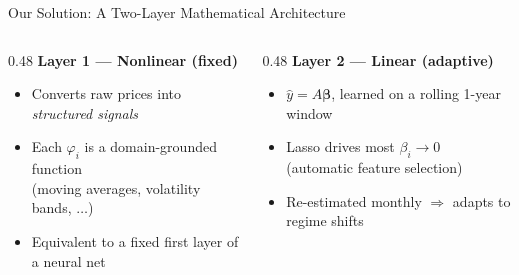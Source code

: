 \documentclass[aspectratio=169]{beamer}
\begin{document}
\begin{frame}{Our Solution: A Two-Layer Mathematical Architecture}
  \vspace{0.5em}
  \begin{columns}[T]
    \begin{column}{0.48\textwidth}
      \textbf{Layer 1 --- Nonlinear (fixed)}
      \begin{itemize}\small
        \item Converts raw prices into \emph{structured signals}
        \item Each $\varphi_i$ is a domain-grounded function\\
              (moving averages, volatility bands, $\ldots$)
        \item Equivalent to a fixed first layer of a neural net
      \end{itemize}
    \end{column}
    \begin{column}{0.48\textwidth}
      \textbf{Layer 2 --- Linear (adaptive)}
      \begin{itemize}\small
        \item $\hat{y} = A\boldsymbol{\beta}$, learned on a rolling 1-year window
        \item Lasso drives most $\beta_i \to 0$\\
              (automatic feature selection)
        \item Re-estimated monthly $\Rightarrow$ adapts to regime shifts
      \end{itemize}
    \end{column}
  \end{columns}

\end{frame}
\end{document}

